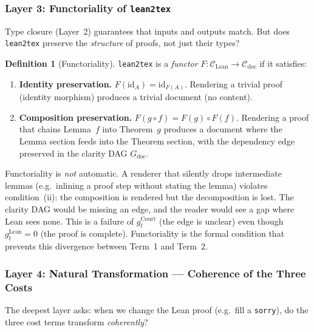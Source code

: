 \documentclass[11pt,a4paper]{article}
\theoremstyle{definition}
\newtheorem{definition}[theorem]{Definition}
\theoremstyle{remark}
\begin{document}
\subsubsection*{Layer 3: Functoriality of \texttt{lean2tex}}

Type closure (Layer~2) guarantees that inputs and outputs match. But does \texttt{lean2tex} preserve the \emph{structure} of proofs, not just their types?

\begin{definition}[Functoriality]\label{def:functoriality}
\texttt{lean2tex} is a \emph{functor} $F: \mathcal{C}_{\mathrm{Lean}} \to \mathcal{C}_{\mathrm{doc}}$ if it satisfies:
\begin{enumerate}[nosep]
\item[(i)] \textbf{Identity preservation.} $F(\mathrm{id}_A) = \mathrm{id}_{F(A)}$. Rendering a trivial proof (identity morphism) produces a trivial document (no content).
\item[(ii)] \textbf{Composition preservation.} $F(g \circ f) = F(g) \circ F(f)$. Rendering a proof that chains Lemma~$f$ into Theorem~$g$ produces a document where the Lemma section feeds into the Theorem section, with the dependency edge preserved in the clarity DAG $G_{\mathrm{doc}}$.
\end{enumerate}
\end{definition}

Functoriality is \emph{not} automatic. A renderer that silently drops intermediate lemmas (e.g.\ inlining a proof step without stating the lemma) violates condition~(ii): the composition is rendered but the decomposition is lost. The clarity DAG would be missing an edge, and the reader would see a gap where Lean sees none. This is a failure of $g_t^{\mathrm{Court}}$ (the edge is unclear) even though $g_t^{\mathrm{Lean}} = 0$ (the proof is complete). Functoriality is the formal condition that prevents this divergence between Term~1 and Term~2.

\subsubsection*{Layer 4: Natural Transformation --- Coherence of the Three Costs}

The deepest layer asks: when we change the Lean proof (e.g.\ fill a \texttt{sorry}), do the three cost terms transform \emph{coherently}?
\end{document}
